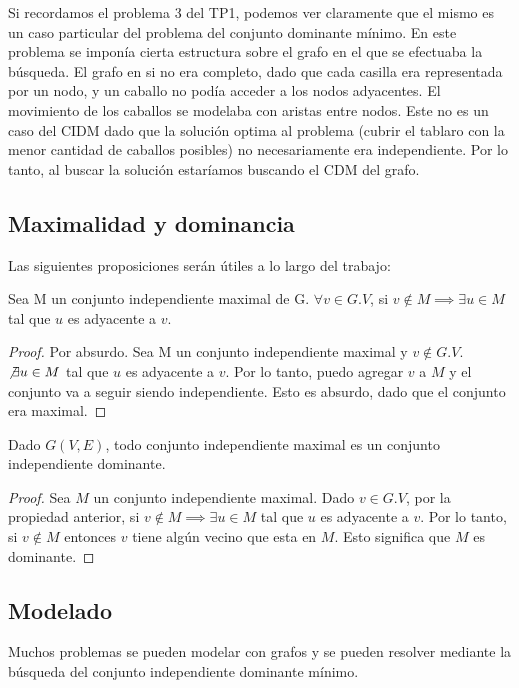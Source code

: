 Si recordamos el problema 3 del TP1, podemos ver claramente que el mismo es un caso particular del problema del conjunto dominante mínimo. En este problema se imponía cierta estructura sobre el grafo en el que se efectuaba la búsqueda. El grafo en si no era completo, dado que cada casilla era representada por un nodo, y un caballo no podía acceder a los nodos adyacentes. El movimiento de los caballos se modelaba con aristas entre nodos. Este no es un caso del CIDM dado que la solución optima al problema (cubrir el tablaro con la menor cantidad de caballos posibles) no necesariamente era independiente. Por lo tanto, al buscar la solución estaríamos buscando el CDM del grafo.

\subsection{Maximalidad y dominancia}

Las siguientes proposiciones serán útiles a lo largo del trabajo:

\begin{proposition}
Sea M un conjunto independiente maximal de G. $\forall v \in G.V$, si $v \notin M \implies \exists u \in M$ tal que $u$ es adyacente a $v$. 
\end{proposition}

\begin{proof}
Por absurdo. Sea M un conjunto independiente maximal y $v \notin G.V$. $\not\exists u \in M$ tal que $u$ es adyacente a $v$. Por lo tanto, puedo agregar $v$ a $M$ y el conjunto va a seguir siendo independiente. Esto es absurdo, dado que el conjunto era maximal.
\end{proof}

\begin{proposition}
Dado $G(V,E)$, todo conjunto independiente maximal es un conjunto independiente dominante.
\end{proposition}

\begin{proof}
Sea $M$ un conjunto independiente maximal. Dado $v \in G.V$, por la propiedad anterior, si $v \notin M \implies \exists u \in M$ tal que $u$ es adyacente a $v$. Por lo tanto, si $v \notin M$ entonces $v$ tiene algún vecino que esta en $M$. Esto significa que $M$ es dominante.
\end{proof}

\newpage

\subsection{Modelado}
Muchos problemas se pueden modelar con grafos y se pueden resolver mediante la búsqueda del conjunto independiente dominante mínimo.

